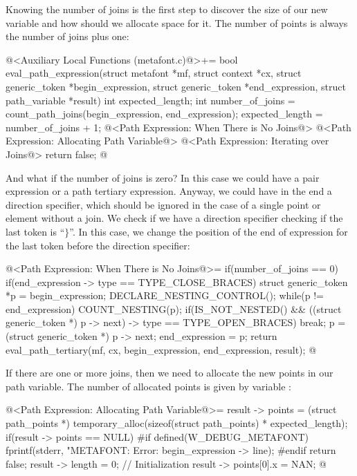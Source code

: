 Knowing the number of joins is the first step to discover the size of
our new variable and how should we allocate space for it. The number
of points is always the number of joins plus one:

\iniciocodigo
@<Auxiliary Local Functions (metafont.c)@>+=
bool eval_path_expression(struct metafont *mf, struct context *cx,
                          struct generic_token *begin_expression,
                          struct generic_token *end_expression,
                          struct path_variable *result){
  int expected_length;
  int number_of_joins = count_path_joins(begin_expression, end_expression);
  expected_length = number_of_joins + 1;
  @<Path Expression: When There is No Joins@>
  @<Path Expression: Allocating Path Variable@>
  @<Path Expression: Iterating over Joins@>
  return false;
}
@
\fimcodigo

And what if the number of joins is zero? In this case we could have a
pair expression or a path tertiary expression. Anyway, we could have
in the end a direction specifier, which should be ignored in the case
of a single point or element without a join. We check if we have a
direction specifier checking if the last token is ``$\}$''. In this case,
we change the position of the end of expression for the last token
before the direction specifier:

\iniciocodigo
@<Path Expression: When There is No Joins@>=
if(number_of_joins == 0){
  if(end_expression -> type == TYPE_CLOSE_BRACES){
    struct generic_token *p = begin_expression;
    DECLARE_NESTING_CONTROL();
    while(p != end_expression){
      COUNT_NESTING(p);
      if(IS_NOT_NESTED() &&
         ((struct generic_token *) p -> next) -> type == TYPE_OPEN_BRACES)
        break;
      p = (struct generic_token *) p -> next;
    }
    end_expression = p;
  }
  return eval_path_tertiary(mf, cx, begin_expression, end_expression,
                           result);
}
@
\fimcodigo

If there are one or more joins, then we need to allocate the new
points in our path variable. The number of allocated points is given
by variable :

\iniciocodigo
@<Path Expression: Allocating Path Variable@>=
result -> points = (struct path_points *)
                     temporary_alloc(sizeof(struct path_points) *
                     expected_length);
if(result -> points == NULL){
#if defined(W_DEBUG_METAFONT)
  fprintf(stderr, "METAFONT: Error: %
          begin_expression -> line);
#endif
    return false;
}
result -> length = 0; // Initialization
result -> points[0].x = NAN;
@
\fimcodigo

